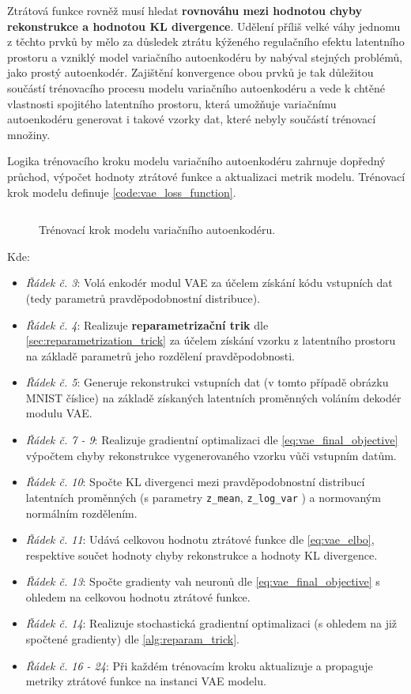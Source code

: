 Ztrátová funkce rovněž musí hledat \textbf{rovnováhu mezi hodnotou chyby rekonstrukce a hodnotou KL divergence}.
Udělení příliš velké váhy jednomu z těchto prvků by mělo za důsledek ztrátu kýženého regulačního efektu latentního prostoru a vzniklý model variačního autoenkodéru by nabýval stejných problémů, jako prostý autoenkodér.
Zajištění konvergence obou prvků je tak důležitou součástí trénovacího procesu modelu variačního autoenkodéru a vede k chtěné vlastnosti spojitého latentního prostoru, která umožňuje variačnímu autoenkodéru generovat i takové vzorky dat, které nebyly součástí trénovací množiny.

Logika trénovacího kroku modelu variačního autoenkodéru zahrnuje dopředný průchod, výpočet hodnoty ztrátové funkce a aktualizaci metrik modelu.
Trénovací krok modelu definuje \autoref{code:vae_loss_function}.

\newpage
\begin{figure}[H]
    \inputminted[linenos]{python}{code_snippets/vae_loss_function.py}
    \caption{Trénovací krok modelu variačního autoenkodéru.}
    \label{code:vae_loss_function}
\end{figure}


Kde:
\begin{itemize}
    \item \emph{Řádek č. 3}: Volá enkodér modul VAE za účelem získání kódu vstupních dat (tedy parametrů pravděpodobnostní distribuce).
    \item \emph{Řádek č. 4}: Realizuje \textbf{reparametrizační trik} dle \autoref{sec:reparametrization_trick} za účelem získání vzorku z latentního prostoru na základě parametrů jeho rozdělení pravděpodobnosti.
    \item \emph{Řádek č. 5}: Generuje rekonstrukci vstupních dat (v tomto případě obrázku MNIST číslice) na základě získaných latentních proměnných voláním dekodér modulu VAE.
    \item \emph{Řádek č. 7 - 9}: Realizuje gradientní optimalizaci dle \autoref{eq:vae_final_objective} výpočtem chyby rekonstrukce vygenerovaného vzorku vůči vstupním datům.
    \item \emph{Řádek č. 10}: Spočte KL divergenci mezi pravděpodobnostní distribucí latentních proměnných (s parametry \lstinline{z_mean}, \lstinline{z_log_var} ) a normovaným normálním rozdělením.
    \item \emph{Řádek č. 11}: Udává celkovou hodnotu ztrátové funkce dle \autoref{eq:vae_elbo}, respektive součet hodnoty chyby rekonstrukce a hodnoty KL divergence.
    \item \emph{Řádek č. 13}: Spočte gradienty vah neuronů dle \autoref{eq:vae_final_objective} s ohledem na celkovou hodnotu ztrátové funkce.
    \item \emph{Řádek č. 14}: Realizuje stochastická gradientní optimalizaci (s ohledem na již spočtené gradienty) dle \autoref{alg:reparam_trick}.
    \item \emph{Řádek č. 16 - 24}: Při každém trénovacím kroku aktualizuje a propaguje metriky ztrátové funkce na instanci VAE modelu.
\end{itemize}

